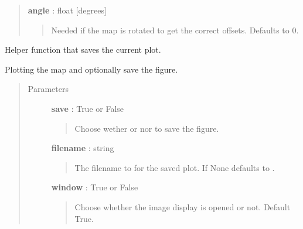 \documentclass[a4paper,10pt,english]{sphinxmanual}
\begin{document}
\begin{fulllineitems}
\begin{fulllineitems}
\begin{quote}
\begin{description}
\textbf{angle} : float {[}degrees{]}
\begin{quote}

Needed if the map is rotated to get the correct offsets. Defaults
to 0.
\end{quote}

\end{description}\end{quote}

\end{fulllineitems}


\begin{fulllineitems}
\label{maps:astrolyze.maps.gildas.GildasMap.save_figure}
Helper function that saves the current plot.

\end{fulllineitems}


\begin{fulllineitems}
\label{maps:astrolyze.maps.gildas.GildasMap.quick_preview}
Plotting the map and optionally save the figure.
\begin{quote}\begin{description}
\item[{Parameters }] \leavevmode
\textbf{save} : True or False
\begin{quote}

Choose wether or nor to save the figure.
\end{quote}

\textbf{filename} : string
\begin{quote}

The filename to for the saved plot. If None defaults to
.
\end{quote}

\textbf{window} : True or False
\begin{quote}

Choose whether the image display is opened or not.
Default True.
\end{quote}

\end{description}\end{quote}


\end{fulllineitems}
\end{fulllineitems}
\end{document}
